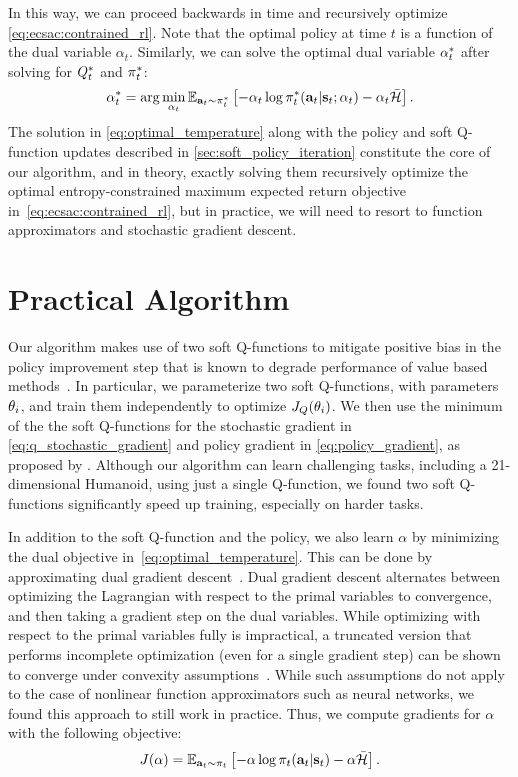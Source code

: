 In this way, we can proceed backwards in time and recursively optimize \autoref{eq:ecsac:contrained_rl}. Note that the optimal policy at time $t$ is a function of the dual variable $\alpha_t$. Similarly, we can solve the optimal dual variable $\alpha_t^*$ after solving for $Q^*_t$ and $\pi_t^*$:
\begin{align}
\alpha_t^* = \arg \min_{\alpha_t} \operatorname{\mathbb{E}}_{{\mathbf{a}_t}\sim \pi_t^*}\left[- \alpha_t\log\pi_t^*({\mathbf{a}_t}|{\mathbf{s}_t}; \alpha_t) - \alpha_t \bar{\mathcal{H}}\right].
\label{eq:optimal_temperature}
\end{align}
The solution in \autoref{eq:optimal_temperature} along with the policy and soft Q-function updates described in \autoref{sec:soft_policy_iteration} constitute the core of our algorithm, and in theory, exactly solving them recursively optimize the optimal entropy-constrained maximum expected return objective in~\autoref{eq:ecsac:contrained_rl}, but in practice, we will need to resort to function approximators and stochastic gradient descent.


\section{Practical Algorithm}     
Our algorithm makes use of two soft Q-functions to mitigate  positive bias in the policy improvement step that is known to degrade performance of value based methods~\citep{hasselt2010double,fujimoto2018addressing}. In particular, we parameterize two soft Q-functions, with parameters $\theta_i$, and train them independently to optimize $J_Q(\theta_i)$. We then use the minimum of the the soft Q-functions for the stochastic gradient in \autoref{eq:q_stochastic_gradient} and policy gradient in \autoref{eq:policy_gradient}, as proposed by \citet{fujimoto2018addressing}. Although our algorithm can learn challenging tasks, including a 21-dimensional Humanoid, using just a single Q-function, we found two soft Q-functions significantly speed up training, especially on harder tasks. 

In addition to the soft Q-function and the policy, we also learn  $\alpha$
by minimizing the dual objective in~\autoref{eq:optimal_temperature}. This can be done by approximating dual gradient descent~\cite{boyd2004convex}. Dual gradient descent alternates between optimizing the Lagrangian with respect to the primal variables to convergence, and then taking a gradient step on the dual variables. While optimizing with respect to the primal variables fully is impractical, a truncated version that performs incomplete optimization (even for a single gradient step) can be shown to converge under convexity assumptions~\cite{boyd2004convex}. While such assumptions do not apply to the case of nonlinear function approximators such as neural networks, we found this approach to still work in practice. Thus, we compute gradients for $\alpha$ with the following objective:
\begin{align}
J(\alpha)  = \operatorname{\mathbb{E}}_{{\mathbf{a}_t}\sim \pi_t}\left[ - \alpha\log\pi_t({\mathbf{a}_t}|{\mathbf{s}_t}) - \alpha \bar{\mathcal{H}}\right].
\label{eq:ecsac:alpha_objective}
\end{align}


